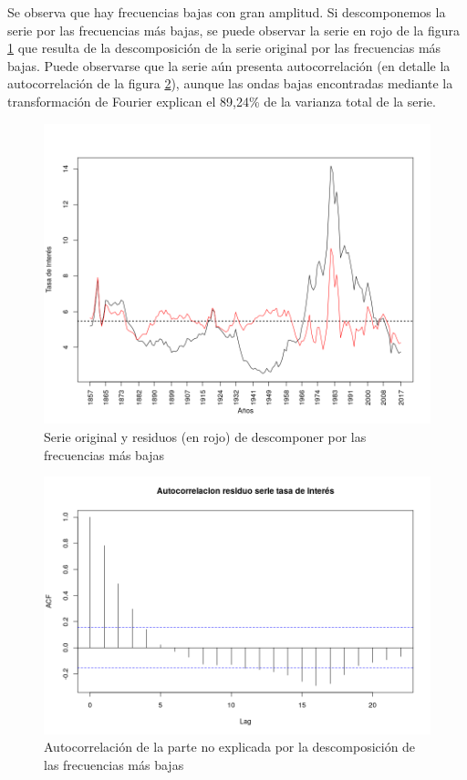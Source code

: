 \documentclass[a4paper]{article}
\begin{document}
Se observa que hay frecuencias bajas con gran amplitud. Si descomponemos la serie por las frecuencias más bajas, se puede observar la serie en rojo de la figura \ref{fig:ir_orig_resid} que resulta de la descomposición de la serie original por las frecuencias más bajas. Puede observarse que la serie aún presenta autocorrelación (en detalle la autocorrelación de la figura \ref{fig:ir_resid_acf}), aunque las ondas bajas encontradas mediante la transformación de Fourier explican el 89,24\% de la varianza total de la serie.

\begin{figure}[H]
	\centering
	\includegraphics[width=0.8\linewidth]{ir_orig_resid.png}
	\caption{Serie original y residuos (en rojo) de descomponer por las frecuencias más bajas} 	
	\label{fig:ir_orig_resid}
\end{figure}

\begin{figure}[H]
	\centering
	\includegraphics[width=0.8\linewidth]{ir_resid_acf.png}
	\caption{Autocorrelación de la parte no explicada por la descomposición de las frecuencias más bajas} 	
	\label{fig:ir_resid_acf}
\end{figure}
\end{document}
